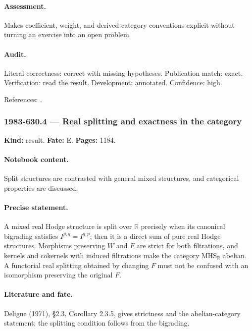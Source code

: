 \paragraph{Assessment.} Makes coefficient, weight, and derived-category conventions explicit without turning an exercise into an open problem.

\paragraph{Audit.} Literal correctness: correct with missing hypotheses. Publication match: exact. Verification: read the result. Development: annotated. Confidence: high.

\noindent References: \citep{deligne1971hodge}.\par

\subsubsection{1983-630.4 --- Real splitting and exactness in the category}

\label{item:1983-630.4}

\noindent\textbf{Kind:} result. \textbf{Fate:} E. \textbf{Pages:} 1184.\par

\paragraph{Notebook content.} Split structures are contrasted with general mixed structures, and categorical properties are discussed.

\paragraph{Precise statement.} A mixed real Hodge structure is split over \(\mathbb R\) precisely when its canonical bigrading satisfies \(\overline{I^{p,q}}=I^{q,p}\); then it is a direct sum of pure real Hodge structures. Morphisms preserving \(W\) and \(F\) are strict for both filtrations, and kernels and cokernels with induced filtrations make the category \(\mathrm{MHS}_{\mathbb R}\) abelian. A functorial real splitting obtained by changing \(F\) must not be confused with an isomorphism preserving the original \(F\).

\paragraph{Literature and fate.} Deligne (1971), \S2.3, Corollary 2.3.5, gives strictness and the abelian-category statement; the splitting condition follows from the bigrading.

